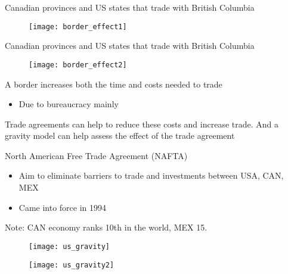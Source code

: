 \documentclass{beamer}
\begin{document}
\begin{frame}{Canadian provinces and US states that trade with British Columbia}
\begin{figure}
  \texttt{[image: border\_effect1]}
\end{figure}  
\end{frame}

\begin{frame}{Canadian provinces and US states that trade with British Columbia}
\begin{figure}
  \texttt{[image: border\_effect2]}
\end{figure}  
\end{frame}

\begin{frame}
  A border increases both the time and costs needed to trade
  \begin{itemize}
    \item Due to bureaucracy mainly
  \end{itemize}
  \medskip
  Trade agreements can help to reduce these costs and increase trade.
  And a gravity model can help assess the effect of the trade agreement
\end{frame}

\begin{frame}
  North American Free Trade Agreement (NAFTA)
  \begin{itemize}
    \item Aim to eliminate barriers to trade and investments between USA, CAN, MEX
    \item Came into force in 1994    
  \end{itemize}
  \medskip
  Note: CAN economy ranks 10th in the world, MEX 15. 
\end{frame}

\begin{frame}
  \begin{figure}\centering
    \texttt{[image: us\_gravity]}
  \end{figure}
\end{frame}

\begin{frame}
  \begin{figure}
    \texttt{[image: us\_gravity2]}
  \end{figure}
\end{frame}
\end{document}
